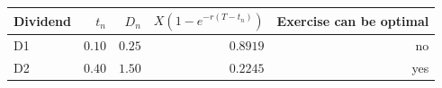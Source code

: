 \begin{tabular}{lrrrr}
\toprule
Dividend & $t_n$ & $D_n$ & $X(1-e^{-r(T-t_n)})$ & Exercise can be optimal \\
\midrule
D1 & $0.10$ & $0.25$ & $0.8919$ & no \\
D2 & $0.40$ & $1.50$ & $0.2245$ & yes \\
\bottomrule
\end{tabular}

